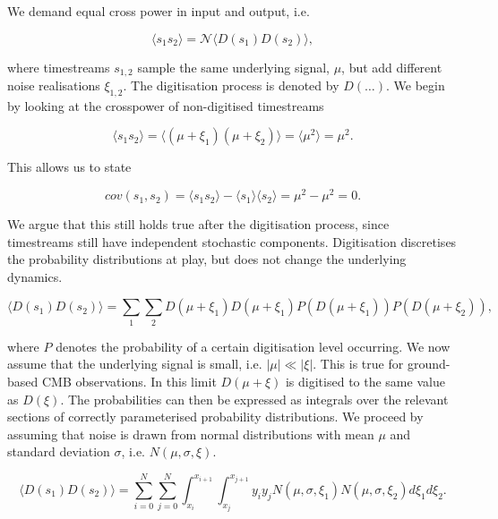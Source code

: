 \documentclass[apj]{emulateapj}
\begin{document}
We demand equal cross power in input and output, i.e.

\begin{equation} \label{eq:normcrosspower}
\langle s_1 s_2 \rangle = \mathcal{N} \langle D(s_1) D(s_2) \rangle,
\end{equation}

where timestreams $s_{1,2}$ sample the same underlying signal, $\mu$, but add different noise realisations $\xi_{1, 2}$. The digitisation process is denoted by $D(\dots)$. We begin by looking at the crosspower of non-digitised timestreams

\begin{equation}
\langle s_1 s_2 \rangle = \langle (\mu + \xi_1) (\mu + \xi_2) \rangle =  \langle \mu^2 \rangle = \mu^2.
\end{equation}

This allows us to state

\begin{equation}
cov(s_1, s_2) = \langle s_1 s_2 \rangle - \langle s_1 \rangle \langle s_2 \rangle = \mu^2 - \mu^2 = 0.
\end{equation}

We argue that this still holds true after the digitisation process, since timestreams still have independent stochastic components. Digitisation discretises the probability distributions at play, but does not change the underlying dynamics.

\begin{equation}
\langle D(s_1) D(s_2) \rangle = \sum_1 \sum_2 D(\mu + \xi_1) D(\mu + \xi_1) P(D(\mu + \xi_1)) P(D(\mu + \xi_2)),
\end{equation}

where $P$ denotes the probability of a certain digitisation level occurring. We now assume that the underlying signal is small, i.e. $| \mu | \ll | \xi |$. This is true for ground-based CMB observations. In this limit $D(\mu + \xi)$ is digitised to the same value as $D(\xi)$. The probabilities can then be expressed as integrals over the relevant sections of correctly parameterised probability distributions. We proceed by assuming that noise is drawn from normal distributions with mean $\mu$ and standard deviation $\sigma$, i.e. $N(\mu, \sigma, \xi)$.

\begin{equation}
\langle D(s_1) D(s_2) \rangle = \sum_{i=0}^N \sum_{j=0}^N  \int_{x_i}^{x_{i+1}} \int_{x_j}^{x_{j+1}} y_i y_j N(\mu, \sigma, \xi_1) N(\mu, \sigma, \xi_2) d\xi_1 d\xi_2.
\end{equation}
\end{document}
